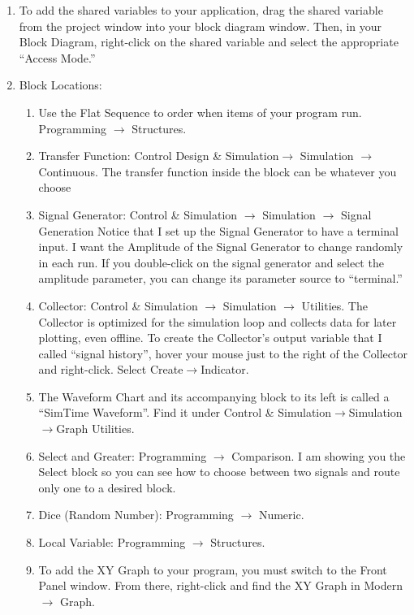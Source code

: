 \documentclass[11pt]{article}
\begin{document}
\begin{enumerate}
    \item To add the shared variables to your application, drag the shared variable from the project window into your block diagram window. Then, in your Block Diagram, right-click on the shared variable and select the appropriate “Access Mode.”
    \item Block Locations:
        \begin{enumerate}
            \item Use the Flat Sequence to order when items of your program run. Programming $\rightarrow$ Structures.
            \item Transfer Function:  Control Design \& Simulation$\rightarrow$ Simulation $\rightarrow$ Continuous. The transfer function inside the block can be whatever you choose
            \item Signal Generator:   Control \& Simulation $\rightarrow$ Simulation $\rightarrow$ Signal Generation
                Notice that I set up the Signal Generator to have a terminal input. I want the Amplitude of the Signal Generator to change randomly in each run. If you double-click on the signal generator and select the amplitude parameter, you can change its parameter source to “terminal.”
            \item Collector:  Control \& Simulation $\rightarrow$ Simulation $\rightarrow$ Utilities. The Collector is optimized for the simulation loop and collects data for later plotting, even offline. To create the Collector’s output variable that I called “signal history”, hover your mouse just to the right of the Collector and right-click. Select Create$\rightarrow$Indicator.
            \item The Waveform Chart and its accompanying block to its left is called a “SimTime Waveform”. Find it under Control \& Simulation$\rightarrow$Simulation$\rightarrow$Graph Utilities.
            \item Select and Greater:  Programming $\rightarrow$ Comparison. I am showing you the Select block so you can see how to choose between two signals and route only one to a desired block.
            \item Dice (Random Number):  Programming $\rightarrow$ Numeric.
            \item Local Variable:  Programming $\rightarrow$ Structures.
            \item To add the XY Graph to your program, you must switch to the Front Panel window. From there, right-click and find the XY Graph in Modern $\rightarrow$ Graph.

\end{enumerate}
\end{enumerate}
\end{document}
